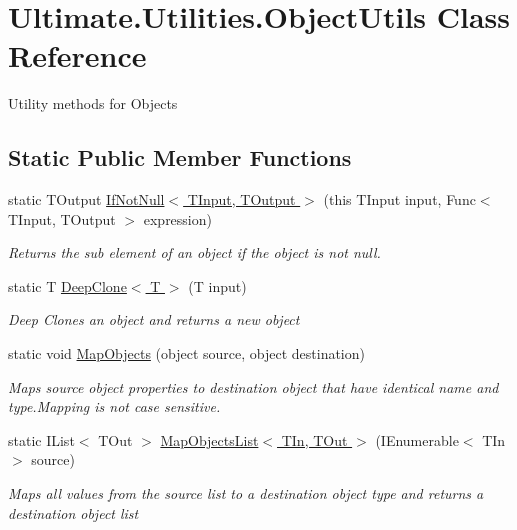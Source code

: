 \hypertarget{class_ultimate_1_1_utilities_1_1_object_utils}{}\section{Ultimate.\+Utilities.\+Object\+Utils Class Reference}
\label{class_ultimate_1_1_utilities_1_1_object_utils}


Utility methods for Objects  


\subsection*{Static Public Member Functions}
\begin{DoxyCompactItemize}
\item 
static T\+Output \hyperlink{class_ultimate_1_1_utilities_1_1_object_utils_a87f38db9e711eeaff2b630358bce4b6b}{If\+Not\+Null$<$ T\+Input, T\+Output $>$} (this T\+Input input, Func$<$ T\+Input, T\+Output $>$ expression)
\begin{DoxyCompactList}\small\item\em Returns the sub element of an object if the object is not null. \end{DoxyCompactList}\item 
static T \hyperlink{class_ultimate_1_1_utilities_1_1_object_utils_afacbde77f95ca1a41731b10285156328}{Deep\+Clone$<$ T $>$} (T input)
\begin{DoxyCompactList}\small\item\em Deep Clones an object and returns a new object \end{DoxyCompactList}\item 
static void \hyperlink{class_ultimate_1_1_utilities_1_1_object_utils_a35b354436ac2f7ba920ca4397da7424c}{Map\+Objects} (object source, object destination)
\begin{DoxyCompactList}\small\item\em Maps source object properties to destination object that have identical name and type.\+Mapping is not case sensitive. \end{DoxyCompactList}\item 
static I\+List$<$ T\+Out $>$ \hyperlink{class_ultimate_1_1_utilities_1_1_object_utils_a834b6fdc4277f9e0c68206c3d38e583c}{Map\+Objects\+List$<$ T\+In, T\+Out $>$} (I\+Enumerable$<$ T\+In $>$ source)
\begin{DoxyCompactList}\small\item\em Maps all values from the source list to a destination object type and returns a destination object list \end{DoxyCompactList}\end{DoxyCompactItemize}


